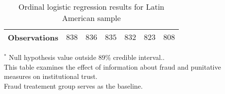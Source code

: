 \begin{table}[h]
\begin{center}
\begin{threeparttable}
\begin{tabular}{l c c c c c c}
\hline
Observations        & $838$             & $836$             & $835$             & $832$             & $823$             & $808$             \\
\hline
\end{tabular}
\begin{tablenotes}[flushleft]
\scriptsize{$^*$ Null hypothesis value outside 89\% credible interval..  \\
This table examines the effect of information about fraud
                      and punitative measures on institutional trust. \\
Fraud treatement group serves as the baseline.}
\end{tablenotes}
\end{threeparttable}
\caption{Ordinal logistic regression results for Latin American sample}
\label{table:coefficients}
\end{center}
\end{table}
